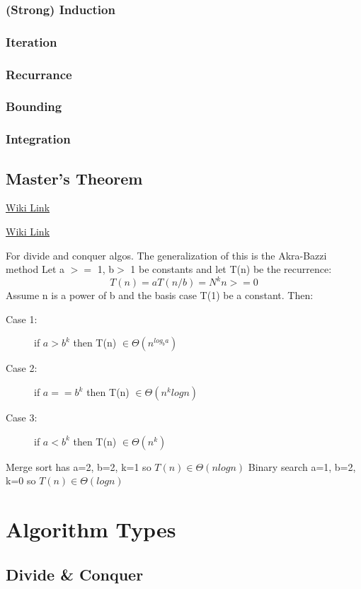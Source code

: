 \subsubsection{(Strong) Induction}
\subsubsection{Iteration}
\subsubsection{Recurrance}
\subsubsection{Bounding}
\subsubsection{Integration}
\subsection{Master's Theorem}
\href{https://en.wikipedia.org/wiki/Master_theorem}{Wiki Link}

\href{https://en.wikipedia.org/wiki/Akra%E2%80%93Bazzi_method}{Wiki Link}


	For divide and conquer algos. The generalization of this is the Akra-Bazzi method
	Let a $>=$ 1, b$>$ 1 be constants and let T(n) be the recurrence:
	\begin{equation}
		T(n) =  aT(n/b) = N^k    n>=0
	\end{equation}
	Assume n is a power of b and the basis case T(1) be a constant. Then:
		\begin{description}
			\item[Case 1:] if $a > b^k$ then T(n) $\in \Theta(n^{log_b a})$
			\item[Case 2:] if $a == b^k$ then T(n) $\in \Theta(n^k log n)$
			\item[Case 3:] if $a < b^k$ then T(n) $\in \Theta(n^k)$
		\end{description}

		Merge sort has a=2, b=2, k=1 so $T(n) \in \Theta(n log n)$
		Binary search a=1, b=2, k=0 so $T(n) \in \Theta(log n)$


\section{Algorithm Types}
\subsection{Divide \& Conquer}
